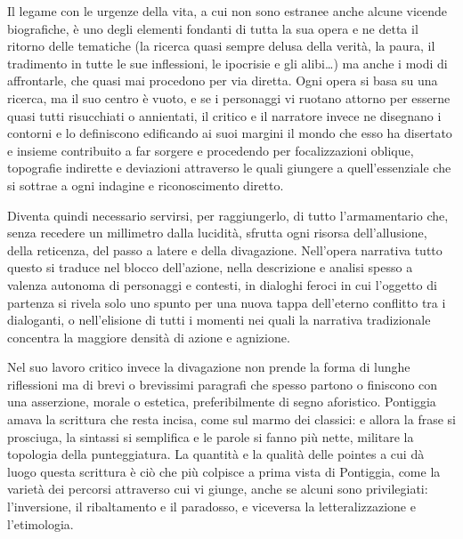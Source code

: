 Il legame con le urgenze della vita, a cui non sono estranee anche alcune vicende biografiche, è uno degli elementi fondanti di tutta la sua opera e ne detta il ritorno delle tematiche (la ricerca quasi sempre delusa della verità, la paura, il tradimento in tutte le sue inflessioni, le ipocrisie e gli alibi…) ma anche i modi di affrontarle, che quasi mai procedono per via diretta. Ogni opera si basa su una ricerca, ma il suo centro è vuoto, e se i personaggi vi ruotano attorno per esserne quasi tutti risucchiati o annientati, il critico e il narratore invece ne disegnano i contorni e lo definiscono edificando ai suoi margini il mondo che esso ha disertato e insieme contribuito a far sorgere e procedendo per focalizzazioni oblique, topografie indirette e deviazioni attraverso le quali giungere a quell’essenziale che si sottrae a ogni indagine e riconoscimento diretto.\newline

Diventa quindi necessario servirsi, per raggiungerlo, di tutto l’armamentario che, senza recedere un millimetro dalla lucidità, sfrutta ogni risorsa dell’allusione, della reticenza, del passo a latere e della divagazione. Nell’opera narrativa tutto questo si traduce nel blocco dell’azione, nella descrizione e analisi spesso a valenza autonoma di personaggi e contesti, in dialoghi feroci in cui l’oggetto di partenza si rivela solo uno spunto per una nuova tappa dell’eterno conflitto tra i dialoganti, o nell’elisione di tutti i momenti nei quali la narrativa tradizionale concentra la maggiore densità di azione e agnizione.\newline

Nel suo lavoro critico invece la divagazione non prende la forma di lunghe riflessioni ma di brevi o brevissimi paragrafi che spesso partono o finiscono con una asserzione, morale o estetica, preferibilmente di segno aforistico. Pontiggia amava la scrittura che resta incisa, come sul marmo dei classici: e allora la frase si prosciuga, la sintassi si semplifica e le parole si fanno più nette, militare la topologia della punteggiatura. La quantità e la qualità delle pointes a cui dà luogo questa scrittura è ciò che più colpisce a prima vista di Pontiggia, come la varietà dei percorsi attraverso cui vi giunge, anche se alcuni sono privilegiati: l’inversione, il ribaltamento e il paradosso, e viceversa la letteralizzazione e l’etimologia.\newline

